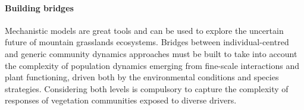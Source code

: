 \paragraph{Building bridges}
Mechanistic models are great tools and can be used to explore the uncertain future of mountain grasslands ecosystems. Bridges between individual-centred and generic community dynamics approaches must be built to take into account the complexity of population dynamics emerging from fine-scale interactions and plant functioning, driven both by the environmental conditions and species strategies. Considering both levels is compulsory to capture the complexity of responses of vegetation communities exposed to diverse drivers.

%
%
%

